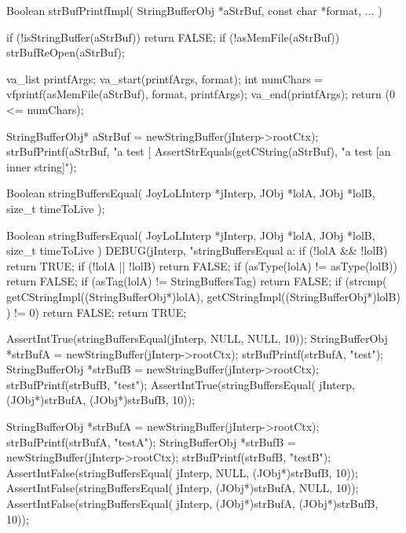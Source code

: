 \startCCode
Boolean strBufPrintfImpl(
  StringBufferObj   *aStrBuf,
  const char        *format,
  ...
) {
  if (!isStringBuffer(aStrBuf)) return FALSE;
  if (!asMemFile(aStrBuf)) strBufReOpen(aStrBuf);
  
  va_list printfArgs;
  va_start(printfArgs, format);
  int numChars = vfprintf(asMemFile(aStrBuf), format, printfArgs);
  va_end(printfArgs);
  return (0 <= numChars);
}
\stopCCode

\startCTest
  StringBufferObj* aStrBuf = newStringBuffer(jInterp->rootCtx);
  strBufPrintf(aStrBuf, "a test [%
  AssertStrEquals(getCString(aStrBuf), "a test [an inner string]");
\stopCTest
\stopTestCase
\stopTestSuite


\startCHeader
Boolean stringBuffersEqual(
  JoyLoLInterp *jInterp,
  JObj         *lolA,
  JObj         *lolB,
  size_t        timeToLive
);
\stopCHeader

\startCCode
Boolean stringBuffersEqual(
  JoyLoLInterp *jInterp,
  JObj         *lolA,
  JObj         *lolB,
  size_t        timeToLive
) {
  DEBUG(jInterp, "stringBuffersEqual a:%
  if (!lolA && !lolB) return TRUE;
  if (!lolA || !lolB) return FALSE;
  if (asType(lolA) != asType(lolB)) return FALSE;
  if (asTag(lolA)  != StringBuffersTag) return FALSE;
  if (strcmp(
    getCStringImpl((StringBufferObj*)lolA),
    getCStringImpl((StringBufferObj*)lolB)
    ) != 0) return FALSE;
  return TRUE;
}
\stopCCode


\startCTest
  AssertIntTrue(stringBuffersEqual(jInterp, NULL, NULL, 10));
  StringBufferObj *strBufA = newStringBuffer(jInterp->rootCtx);
  strBufPrintf(strBufA, "test");
  StringBufferObj *strBufB = newStringBuffer(jInterp->rootCtx);
  strBufPrintf(strBufB, "test");
  AssertIntTrue(stringBuffersEqual(
    jInterp, (JObj*)strBufA, (JObj*)strBufB, 10));
\stopCTest
\stopTestCase


\startCTest
  StringBufferObj *strBufA = newStringBuffer(jInterp->rootCtx);
  strBufPrintf(strBufA, "testA");
  StringBufferObj *strBufB = newStringBuffer(jInterp->rootCtx);
  strBufPrintf(strBufB, "testB");
  AssertIntFalse(stringBuffersEqual(
    jInterp, NULL, (JObj*)strBufB, 10));
  AssertIntFalse(stringBuffersEqual(
    jInterp, (JObj*)strBufA, NULL, 10));
  AssertIntFalse(stringBuffersEqual(
    jInterp, (JObj*)strBufA, (JObj*)strBufB, 10));
\stopCTest
\stopTestCase
\stopTestSuite

